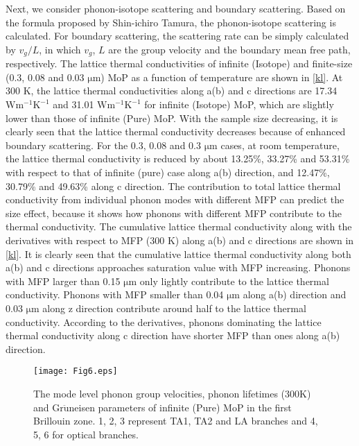 \documentclass[twocolumn,showkeys,aps,prb,showpacs]{revtex4-1}
\begin{document}
Next, we consider phonon-isotope scattering and boundary scattering. Based on the formula proposed  by Shin-ichiro Tamura\cite{q24}, the phonon-isotope scattering  is  calculated. For boundary scattering,   the scattering rate can be simply calculated by $v_g/L$, in which $v_g$, $L$  are the group velocity and  the boundary mean free path, respectively.  The lattice thermal conductivities  of infinite (Isotope) and finite-size (0.3, 0.08 and 0.03 $\mathrm{\mu m}$) MoP as a function of temperature are shown in \autoref{kl}. At 300 K, the lattice thermal conductivities along a(b) and c directions are 17.34 $\mathrm{W m^{-1} K^{-1}}$  and 31.01 $\mathrm{W m^{-1} K^{-1}}$ for infinite (Isotope)  MoP, which are slightly lower than those of infinite (Pure)  MoP.
With the sample size decreasing, it is clearly seen that the lattice thermal conductivity decreases because of enhanced boundary scattering.
For the 0.3, 0.08 and 0.3 $\mathrm{\mu m}$ cases, at room temperature, the lattice thermal conductivity  is reduced by about 13.25\%, 33.27\% and 53.31\%  with respect to that of infinite (pure) case along a(b) direction, and 12.47\%, 30.79\% and 49.63\%  along c direction.
The contribution to  total lattice thermal
conductivity from individual phonon modes with different MFP  can predict the
size effect, because it shows how phonons with
different MFP contribute to the thermal conductivity.
The cumulative lattice thermal conductivity along with the derivatives with respect to MFP (300 K)  along a(b) and c directions are shown in \autoref{kl}.
 It is clearly seen that the cumulative lattice thermal conductivity along both a(b) and c directions approaches saturation value  with MFP increasing.
 Phonons with MFP larger than 0.15 $\mathrm{\mu m}$ only lightly contribute  to the lattice thermal conductivity.
 Phonons with MFP smaller than 0.04 $\mathrm{\mu m}$ along a(b) direction and 0.03 $\mathrm{\mu m}$ along z direction
 contribute  around half  to the lattice thermal conductivity. According to the derivatives, phonons  dominating  the lattice thermal conductivity   along c direction have  shorter MFP than ones along a(b) direction.
\begin{figure*}
  \texttt{[image: Fig6.eps]}
  \caption{The mode level phonon group velocities, phonon lifetimes (300K) and   Gr$\mathrm{\ddot{u}}$neisen parameters  of infinite (Pure) MoP in the first Brillouin zone. 1, 2, 3 represent  TA1, TA2 and LA branches and 4, 5, 6 for optical branches.}\label{v}
\end{figure*}
\end{document}
